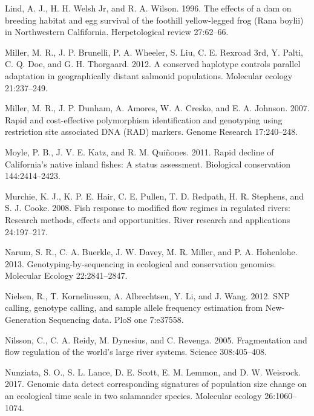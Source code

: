 \documentclass[twoside,12pt,final]{ucthesis-CA2012} %
\begin{document}
\begin{ucmainmatter}
\leavevmode\hypertarget{ref-lind_effects_1996}{}%
Lind, A. J., H. H. Welsh Jr, and R. A. Wilson. 1996. The effects of a
dam on breeding habitat and egg survival of the foothill yellow-legged
frog (Rana boylii) in Northwestern Calfifornia. Herpetological review
27:62--66.

\leavevmode\hypertarget{ref-miller_conserved_2012}{}%
Miller, M. R., J. P. Brunelli, P. A. Wheeler, S. Liu, C. E. Rexroad 3rd,
Y. Palti, C. Q. Doe, and G. H. Thorgaard. 2012. A conserved haplotype
controls parallel adaptation in geographically distant salmonid
populations. Molecular ecology 21:237--249.

\leavevmode\hypertarget{ref-miller_rapid_2007}{}%
Miller, M. R., J. P. Dunham, A. Amores, W. A. Cresko, and E. A. Johnson.
2007. Rapid and cost-effective polymorphism identification and
genotyping using restriction site associated DNA (RAD) markers. Genome
Research 17:240--248.

\leavevmode\hypertarget{ref-moyle_rapid_2011}{}%
Moyle, P. B., J. V. E. Katz, and R. M. Quiñones. 2011. Rapid decline of
California's native inland fishes: A status assessment. Biological
conservation 144:2414--2423.

\leavevmode\hypertarget{ref-murchie_fish_2008}{}%
Murchie, K. J., K. P. E. Hair, C. E. Pullen, T. D. Redpath, H. R.
Stephens, and S. J. Cooke. 2008. Fish response to modified flow regimes
in regulated rivers: Research methods, effects and opportunities. River
research and applications 24:197--217.

\leavevmode\hypertarget{ref-narum_genotyping-by-sequencing_2013}{}%
Narum, S. R., C. A. Buerkle, J. W. Davey, M. R. Miller, and P. A.
Hohenlohe. 2013. Genotyping-by-sequencing in ecological and conservation
genomics. Molecular Ecology 22:2841--2847.

\leavevmode\hypertarget{ref-nielsen_snp_2012}{}%
Nielsen, R., T. Korneliussen, A. Albrechtsen, Y. Li, and J. Wang. 2012.
SNP calling, genotype calling, and sample allele frequency estimation
from New-Generation Sequencing data. PloS one 7:e37558.

\leavevmode\hypertarget{ref-nilsson_fragmentation_2005}{}%
Nilsson, C., C. A. Reidy, M. Dynesius, and C. Revenga. 2005.
Fragmentation and flow regulation of the world's large river systems.
Science 308:405--408.

\leavevmode\hypertarget{ref-nunziata_genomic_2017}{}%
Nunziata, S. O., S. L. Lance, D. E. Scott, E. M. Lemmon, and D. W.
Weisrock. 2017. Genomic data detect corresponding signatures of
population size change on an ecological time scale in two salamander
species. Molecular ecology 26:1060--1074.


\end{ucmainmatter}
\end{document}
